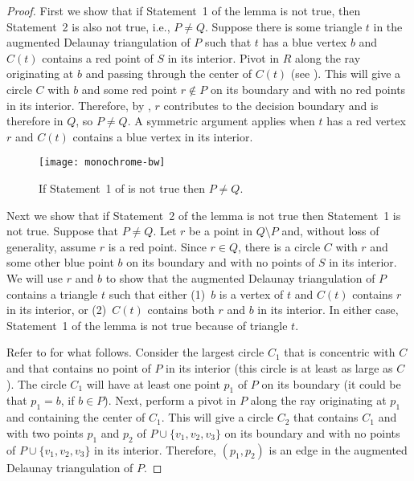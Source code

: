 \documentclass[lotsofwhite,charterfonts]{patmorin}
\begin{document}
\begin{proof} 
First we show that if Statement~1 of the lemma is not true, then
Statement~2 is also not true, i.e., $P\neq Q$.  Suppose there is some
triangle $t$ in the augmented Delaunay triangulation of $P$ such that
$t$ has a blue vertex $b$ and $C(t)$ contains a red point of $S$ in
its interior.  Pivot in $R$ along the ray originating at $b$ and
passing through the center of $C(t)$ (see ).  This
will give a circle $C$ with $b$ and some red point $r\notin P$ on its
boundary and with no red points in its interior.  Therefore, by
, $r$ contributes to the decision boundary and is
therefore in $Q$, so $P\neq Q$.  A symmetric argument applies when $t$
has a red vertex $r$ and $C(t)$ contains a blue vertex in its
interior.

\begin{figure}
\centerline{\texttt{[image: monochrome-bw]}}
\caption{If Statement~1 of  is not true then
$P\neq Q$.}
\end{figure}

Next we show that if Statement~2 of the lemma is not true then
Statement~1 is not true.  Suppose that $P\neq Q$.  Let $r$ be a point
in $Q\setminus P$ and, without loss of generality, assume $r$ is a red
point.  Since $r\in Q$, there is a circle $C$ with $r$ and some
other blue point $b$ on its boundary and with no points of $S$ in its
interior.  We will use $r$ and $b$ to show that the augmented Delaunay
triangulation of $P$ contains a triangle $t$ such that either (1)~$b$
is a vertex of $t$ and $C(t)$ contains $r$ in its interior, or
(2)~$C(t)$ contains both $r$ and $b$ in its interior.  In either case,
Statement~1 of the lemma is not true because of triangle $t$.

Refer to  for what follows.  Consider the largest
circle $C_1$ that is concentric with $C$ and that contains no point of
$P$ in its interior (this circle is at least as large as $C$).  The
circle $C_1$ will have at least one point $p_1$ of $P$ on its boundary
(it could be that $p_1=b$, if $b\in P$).  Next, perform a pivot in $P$
along the ray originating at $p_1$ and containing the center of $C_1$.
This will give a circle $C_2$ that contains $C_1$ and with two points
$p_1$ and $p_2$ of $P\cup\{v_1,v_2,v_3\}$ on its boundary and with no
points of $P\cup\{v_1,v_2,v_3\}$ in its interior.  Therefore,
$(p_1,p_2)$ is an edge in the augmented Delaunay triangulation of $P$. 


\end{proof}
\end{document}
